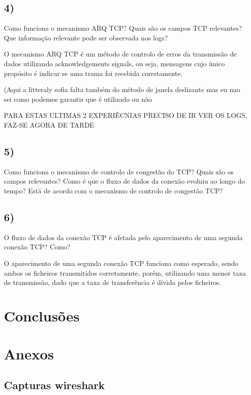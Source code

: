 \documentclass[11pt]{article}
\begin{document}
\subsection{4)} Como funciona o mecanismo ARQ TCP? Quais são os campos TCP relevantes? Que informação relevante pode ser observada nos logs?

O mecanismo ARQ TCP é um método de controlo de erros da transmissão de dados utilizando acknowledgements signals, ou seja, mensagens cujo único propósito é indicar se uma trama foi recebida corretamente.

(Aqui a litteraly sofia falta também do método de janela deslizante mas eu nao sei como podemos garantir que é utilizado ou não

PARA ESTAS ULTIMAS 2 EXPERIÊCNIAS PRECISO DE IR VER OS LOGS, FAZ-SE AGORA DE TARDE

\subsection{5)} Como funciona o mecanismo de controlo de congestão do TCP? Quais são os campos relevantes? Como é que o fluxo de dados da conexão evoluiu ao longo do tempo? Está de acordo com o mecanismo de controlo de congestão TCP?



\subsection{6)} O fluxo de dados da conexão TCP é afetada pelo aparecimento de uma segunda conexão TCP? Como?

O aparecimento de uma segunda conexão TCP funciona como esperado, sendo ambos os ficheiros transmitidos corretamente, porém, utilizando uma menor taxa de transmissão, dado que a taxa de transferência é divida pelos ficheiros.


\section{Conclusões}


\section{Anexos}

\subsection{Capturas wireshark}
\end{document}
